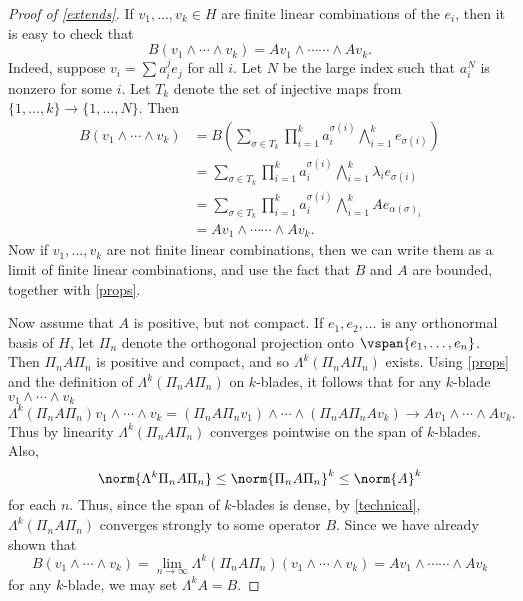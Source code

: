 \documentclass[12pt]{amsart}
\begin{document}
\begin{proof}[Proof of \cref{extends}]
If $v_1,\ldots,v_k \in H$ are finite linear combinations of the $e_i$, then it is easy to check that
\[B(v_1\wedge \cdots \wedge v_k) = Av_1 \wedge  \cdots \cdots\wedge Av_k.\] Indeed, suppose $v_i = \sum a_i^je_j$ for all $i$. Let $N$ be the large index such that $a_i^N$ is nonzero for some $i$. Let $T_k$ denote the set of injective maps from $\{1,\ldots,k\} \to \{1,\ldots,N\}$. Then
\begin{align*}
B(v_1\wedge \cdots \wedge v_k) &= B\left(\sum_{\sigma \in T_k} \prod_{i=1}^k a_i^{\sigma(i)}\bigwedge_{i=1}^k e_{\sigma(i)}\right)\\
&=  \sum_{\sigma \in T_k}\prod_{i=1}^k a_i^{\sigma(i)}\bigwedge_{i=1}^k \lambda_i e_{\sigma(i)}\\
&= \sum_{\sigma \in T_k} \prod_{i=1}^k a_i^{\sigma(i)}\bigwedge_{i=1}^k Ae_{\alpha(\sigma)_i}\\
&= Av_1 \wedge  \cdots \cdots\wedge Av_k.\end{align*}
Now if $v_1,\ldots,v_k$ are not finite linear combinations, then we can write them as a limit of finite linear combinations, and use the fact that $B$ and $A$ are bounded, together with \cref{props}.

Now assume that $A$ is positive, but not compact. If $e_1,e_2,\ldots$ is any orthonormal basis of $H$, let $\Pi_n$ denote the orthogonal projection onto $\vspan\{e_1,\ldots,e_n\}$. Then $\Pi_n A \Pi_n$ is positive and compact, and so $\Lambda^k (\Pi_n A \Pi_n)$ exists. Using \cref{props} and the definition of $\Lambda^k(\Pi_n A \Pi_n)$ on $k$-blades, it follows that for any $k$-blade $v_1\wedge \cdots \wedge v_k$ 
\[\Lambda^k (\Pi_n A \Pi_n)v_1\wedge \cdots \wedge v_k = (\Pi_n A \Pi_n v_1)\wedge \cdots \wedge (\Pi_n A \Pi_n A v_k) \to Av_1 \wedge \cdots \wedge Av_k.\] Thus by linearity $\Lambda^k (\Pi_n A \Pi_n)$ converges pointwise on the span of $k$-blades. Also, \[\norm{\Lambda^k\Pi_n A \Pi_n} \leq \norm{\Pi_nA\Pi_n}^k \leq \norm{A}^k\] for each $n$. Thus, since the span of $k$-blades is dense, by \cref{technical}, $\Lambda^k (\Pi_n A \Pi_n)$ converges strongly to some operator $B$. Since we have already shown that
\[B(v_1\wedge \cdots \wedge v_k) = \lim_{n \to \infty} \Lambda^k(\Pi_n A \Pi_n)(v_1\wedge \cdots \wedge v_k) = Av_1 \wedge  \cdots \cdots\wedge Av_k\] for any $k$-blade, we may set $\Lambda^k A = B$.


\end{proof}
\end{document}
